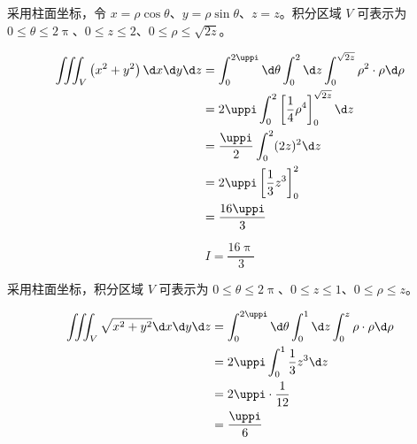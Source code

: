 \begin{solution}
    采用柱面坐标，令 $x=\rho \cos \theta$、$y=\rho \sin \theta$、$z=z$。积分区域 $V$ 可表示为 $0 \leqslant \theta \leqslant 2 \uppi$、$0 \leqslant z \leqslant 2$、$0 \leqslant \rho \leqslant \sqrt{2 z}$。

    \begin{equation}
        \begin{aligned}
            \iiint_{V}\left(x^{2}+y^{2}\right) \d x \d y \d z & = \int_{0}^{2 \uppi} \d \theta \int_{0}^{2} \d z \int_{0}^{\sqrt{2 z}} \rho^{2} \cdot \rho \d \rho \\
                                                              & = 2 \uppi \int_{0}^{2} \left[ \frac{1}{4} \rho^{4} \right]_{0}^{\sqrt{2 z}} \d z                   \\
                                                              & = \frac{\uppi}{2} \int_{0}^{2} (2 z)^{2} \d z                                                      \\
                                                              & = 2 \uppi \left[ \frac{1}{3} z^3 \right]_{0}^{2}                                                   \\
                                                              & = \frac{16 \uppi}{3} \label{eq:I1}
        \end{aligned}
    \end{equation}

    \begin{equation}
        I = \boxed{\frac{16 \uppi}{3}}
    \end{equation}

    采用柱面坐标，积分区域 $V$ 可表示为 $0 \leqslant \theta \leqslant 2 \uppi$、$0 \leqslant z \leqslant 1$、$0 \leqslant \rho \leqslant z$。

    \begin{equation}
        \begin{aligned}
            \iiint_{V} \sqrt{x^{2}+y^{2}} \d x \d y \d z & = \int_{0}^{2 \uppi} \d \theta \int_{0}^{1} \d z \int_{0}^{z} \rho \cdot \rho \d \rho \\
                                                         & = 2 \uppi \int_{0}^{1} \frac{1}{3} z^{3} \d z                                         \\
                                                         & = 2 \uppi \cdot \frac{1}{12}                                                          \\
                                                         & = \frac{\uppi}{6} \label{eq:I2}
        \end{aligned}
    \end{equation}


\end{solution}
